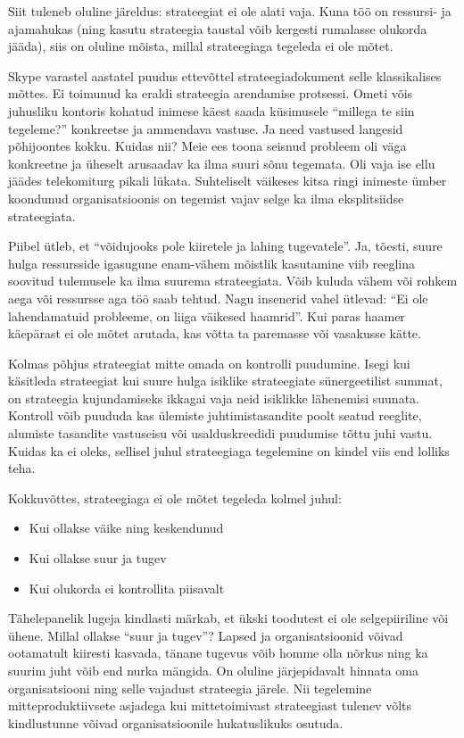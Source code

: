 Siit tuleneb oluline järeldus: strateegiat ei ole alati vaja. Kuna töö on ressursi- ja ajamahukas (ning kasutu strateegia taustal võib kergesti rumalasse olukorda jääda), siis on oluline mõista, millal strateegiaga tegeleda ei ole mõtet.

Skype varastel aastatel puudus ettevõttel strateegiadokument selle klassikalises mõttes. Ei toimunud ka eraldi strateegia arendamise protsessi. Ometi võis juhusliku kontoris kohatud inimese käest saada küsimusele \enquote{millega te siin tegeleme?} konkreetse ja ammendava vastuse. Ja need vastused langesid põhijoontes kokku. Kuidas nii? Meie ees toona seisnud probleem oli väga konkreetne ja üheselt arusaadav ka ilma suuri sõnu tegemata. Oli vaja ise ellu jäädes telekomiturg pikali lükata. Suhteliselt väikeses kitsa ringi inimeste ümber koondunud organisatsioonis on tegemist vajav selge ka ilma eksplitsiidse strateegiata. 

Piibel ütleb, et \enquote{võidujooks pole kiiretele ja lahing tugevatele}. Ja, tõesti, suure hulga ressursside igasugune enam-vähem mõistlik kasutamine viib reeglina soovitud tulemusele ka ilma suurema strateegiata. Võib kuluda vähem või rohkem aega või ressursse aga töö saab tehtud. Nagu insenerid vahel ütlevad: \enquote{Ei ole lahendamatuid probleeme, on liiga väikesed haamrid}. Kui paras haamer käepärast ei ole mõtet arutada, kas võtta ta paremasse või vasakusse kätte.

Kolmas põhjus strateegiat mitte omada on kontrolli puudumine. Isegi kui käsitleda strateegiat kui suure hulga isiklike strateegiate sünergeetilist summat, on strateegia kujundamiseks ikkagai vaja neid isiklikke lähenemisi suunata. Kontroll võib puududa kas ülemiste juhtimistasandite poolt seatud reeglite, alumiste tasandite vastuseisu või usalduskreedidi puudumise tõttu juhi vastu. Kuidas ka ei oleks, sellisel juhul strateegiaga tegelemine on kindel viis end lolliks teha. 

Kokkuvõttes, strateegiaga ei ole mõtet tegeleda kolmel juhul:
\begin{itemize}
	\item Kui ollakse väike ning keskendunud
	\item Kui ollakse suur ja tugev
	\item Kui olukorda ei kontrollita piisavalt
\end{itemize}

Tähelepanelik lugeja kindlasti märkab, et ükski toodutest ei ole selgepiiriline või ühene. Millal ollakse \enquote{suur ja tugev}? Lapsed ja organisatsioonid võivad ootamatult kiiresti kasvada, tänane tugevus võib homme olla nõrkus ning ka suurim juht võib end nurka mängida. On oluline järjepidavalt hinnata oma organisatsiooni ning selle vajadust strateegia järele. Nii tegelemine mitteproduktiivsete asjadega kui mittetoimivast strateegiast tulenev võlts kindlustunne võivad organisatsioonile hukatuslikuks osutuda. 

